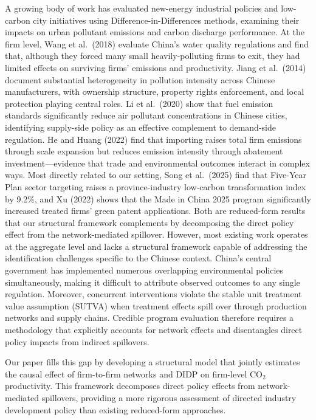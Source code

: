 \documentclass[11pt,a4paper]{article}
\begin{document}
A growing body of work has evaluated new-energy industrial policies and low-carbon city initiatives using Difference-in-Differences methods, examining their impacts on urban pollutant emissions and carbon discharge performance. At the firm level, Wang et al.\ (2018) evaluate China's water quality regulations and find that, although they forced many small heavily-polluting firms to exit, they had limited effects on surviving firms' emissions and productivity. Jiang et al.\ (2014) document substantial heterogeneity in pollution intensity across Chinese manufacturers, with ownership structure, property rights enforcement, and local protection playing central roles. Li et al.\ (2020) show that fuel emission standards significantly reduce air pollutant concentrations in Chinese cities, identifying supply-side policy as an effective complement to demand-side regulation. He and Huang (2022) find that importing raises total firm emissions through scale expansion but reduces emission intensity through abatement investment---evidence that trade and environmental outcomes interact in complex ways. Most directly related to our setting, Song et al.\ (2025) find that Five-Year Plan sector targeting raises a province-industry low-carbon transformation index by 9.2\%, and Xu (2022) shows that the Made in China 2025 program significantly increased treated firms' green patent applications. Both are reduced-form results that our structural framework complements by decomposing the direct policy effect from the network-mediated spillover. However, most existing work operates at the aggregate level and lacks a structural framework capable of addressing the identification challenges specific to the Chinese context. China's central government has implemented numerous overlapping environmental policies simultaneously, making it difficult to attribute observed outcomes to any single regulation. Moreover, concurrent interventions violate the stable unit treatment value assumption (SUTVA) when treatment effects spill over through production networks and supply chains. Credible program evaluation therefore requires a methodology that explicitly accounts for network effects and disentangles direct policy impacts from indirect spillovers.

Our paper fills this gap by developing a structural model that jointly estimates the causal effect of firm-to-firm networks and DIDP on firm-level CO$_2$ productivity. This framework decomposes direct policy effects from network-mediated spillovers, providing a more rigorous assessment of directed industry development policy than existing reduced-form approaches.
\end{document}
